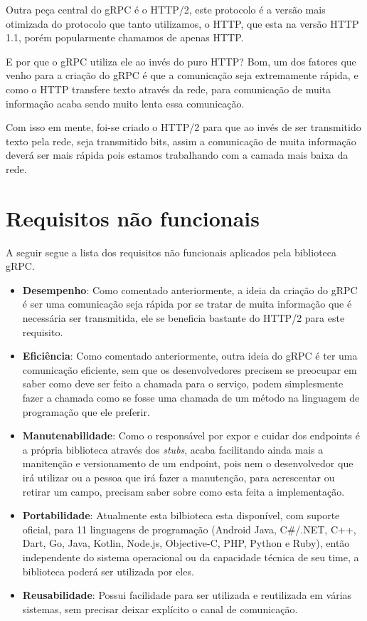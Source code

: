 \documentclass[a4paper, 12pt]{article}
\begin{document}
Outra peça central do gRPC é o HTTP/2, este protocolo é a versão mais otimizada do protocolo que tanto utilizamos, o HTTP, que esta na versão HTTP 1.1, porém popularmente chamamos de apenas HTTP.

E por que o gRPC utiliza ele ao invés do puro HTTP?
Bom, um dos fatores que venho para a criação do gRPC é que a comunicação seja extremamente rápida,
e como o HTTP transfere texto através da rede, para comunicação de muita informação acaba sendo muito lenta essa comunicação.

Com isso em mente, foi-se criado o HTTP/2 para que ao invés de ser transmitido texto pela rede, seja transmitido bits,
assim a comunicação de muita informação deverá ser mais rápida pois estamos trabalhando com a camada mais baixa da rede.

\section{Requisitos não funcionais}

A seguir segue a lista dos requisitos não funcionais aplicados pela biblioteca gRPC.

\begin{itemize}
  \item \textbf{Desempenho}:
    Como comentado anteriormente, a ideia da criação do gRPC é ser uma comunicação seja rápida por se tratar de muita informação que é necessária ser transmitida, ele se beneficia bastante do HTTP/2 para este requisito.
  \item \textbf{Eficiência}:
    Como comentado anteriormente, outra ideia do gRPC é ter uma comunicação eficiente, sem que os desenvolvedores precisem se preocupar em saber como deve ser feito a chamada para o serviço, podem simplesmente fazer a chamada como se fosse uma chamada de um método na linguagem de programação que ele preferir.
  \item \textbf{Manutenabilidade}:
    Como o responsável por expor e cuidar dos endpoints é a própria biblioteca através dos \emph{stubs}, acaba facilitando ainda mais a manitenção e versionamento de um endpoint, pois nem o desenvolvedor que irá utilizar ou a pessoa que irá fazer a manutenção, para acrescentar ou retirar um campo, precisam saber sobre como esta feita a implementação.
  \item \textbf{Portabilidade}:
    Atualmente esta bilbioteca esta disponível, com suporte oficial, para 11 linguagens de programação (Android Java, C\#/.NET, C++, Dart, Go, Java, Kotlin, Node.js, Objective-C, PHP, Python e Ruby), então independente do sistema operacional ou da capacidade técnica de seu time, a biblioteca poderá ser utilizada por eles.
  \item \textbf{Reusabilidade}:
    Possui facilidade para ser utilizada e reutilizada em várias sistemas, sem precisar deixar explícito o canal de comunicação.
\end{itemize}
\end{document}
